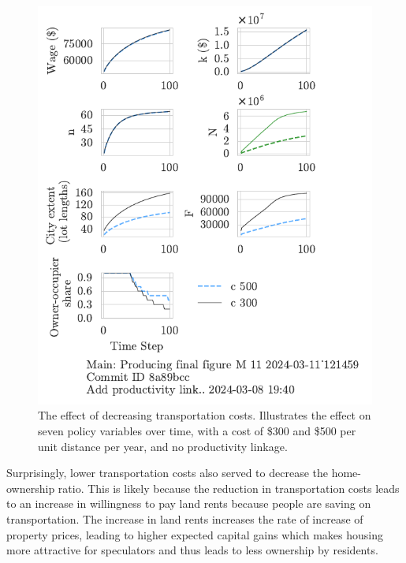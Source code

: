 
\begin{figure}[h!b]
\centering
\includegraphics[scale=0.9, trim={0 1.4cm 0 0},clip]{fig/c-Main-121459.pdf}
\caption[The effect of decreasing transportation costs]{The effect of decreasing transportation costs. Illustrates the effect on seven policy variables over time, with a cost of \$300 and \$500 per unit distance per year, and no productivity linkage.}
\label{fig:c_ownership_trajectory}
\end{figure}


Surprisingly, lower transportation costs also served to decrease the home-ownership ratio. This is likely because the reduction in transportation costs leads to an increase in willingness to pay land rents because people are saving on transportation. The increase in land rents increases the rate of increase of property prices, leading to higher expected capital gains which makes housing more attractive for speculators and thus leads to less ownership by residents. 


